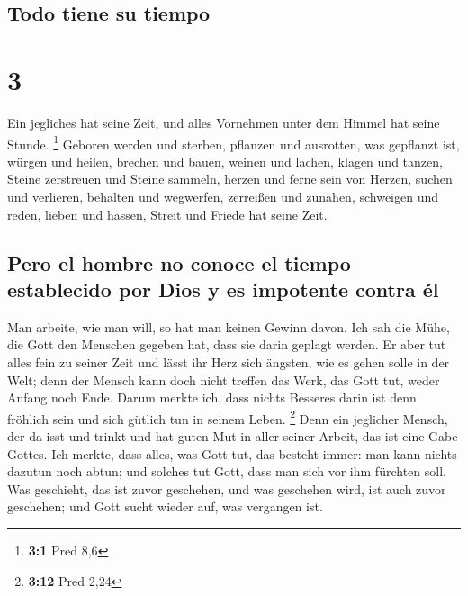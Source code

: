 \hypertarget{todo-tiene-su-tiempo}{%
\subsection{Todo tiene su tiempo}\label{todo-tiene-su-tiempo}}

\hypertarget{section-2}{%
\section{3}\label{section-2}}

 Ein jegliches hat seine Zeit, und alles Vornehmen unter
dem Himmel hat seine Stunde. \footnote{\textbf{3:1} Pred 8,6}
 Geboren werden und sterben, pflanzen und ausrotten, was
gepflanzt ist,  würgen und heilen, brechen und bauen,
 weinen und lachen, klagen und tanzen, 
Steine zerstreuen und Steine sammeln, herzen und ferne sein von Herzen,
 suchen und verlieren, behalten und wegwerfen,
 zerreißen und zunähen, schweigen und reden,
 lieben und hassen, Streit und Friede hat seine Zeit.

\hypertarget{pero-el-hombre-no-conoce-el-tiempo-establecido-por-dios-y-es-impotente-contra-uxe9l}{%
\subsection{Pero el hombre no conoce el tiempo establecido por Dios y es
impotente contra
él}\label{pero-el-hombre-no-conoce-el-tiempo-establecido-por-dios-y-es-impotente-contra-uxe9l}}

 Man arbeite, wie man will, so hat man keinen Gewinn
davon.  Ich sah die Mühe, die Gott den Menschen gegeben
hat, dass sie darin geplagt werden.  Er aber tut alles
fein zu seiner Zeit und lässt ihr Herz sich ängsten, wie es gehen solle
in der Welt; denn der Mensch kann doch nicht treffen das Werk, das Gott
tut, weder Anfang noch Ende.  Darum merkte ich, dass
nichts Besseres darin ist denn fröhlich sein und sich gütlich tun in
seinem Leben. \footnote{\textbf{3:12} Pred 2,24}  Denn
ein jeglicher Mensch, der da isst und trinkt und hat guten Mut in aller
seiner Arbeit, das ist eine Gabe Gottes.  Ich merkte,
dass alles, was Gott tut, das besteht immer: man kann nichts dazutun
noch abtun; und solches tut Gott, dass man sich vor ihm fürchten soll.
 Was geschieht, das ist zuvor geschehen, und was
geschehen wird, ist auch zuvor geschehen; und Gott sucht wieder auf, was
vergangen ist.

